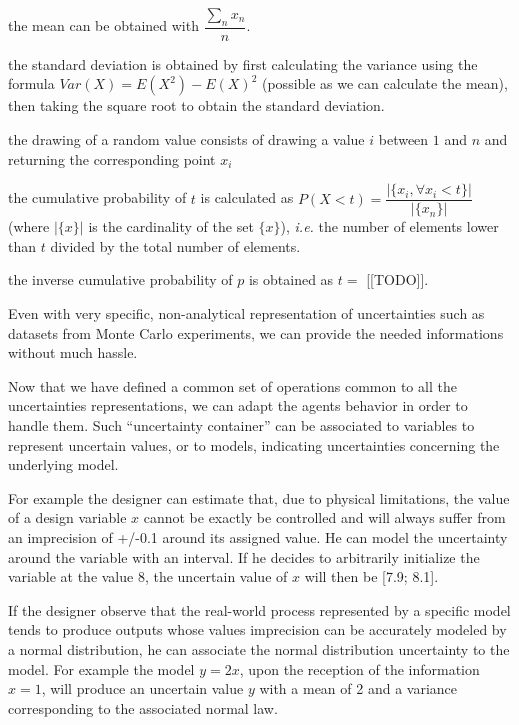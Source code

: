 \begin{compactitem}
\item the mean can be obtained with $\dfrac{\displaystyle\sum_n{x_n}}{n}$.
\item the standard deviation is obtained by first calculating the variance using the formula $Var(X) = E(X^2) - E(X)^2$ (possible as we can calculate the mean), then taking the square root to obtain the standard deviation.
\item the drawing of a random value consists of drawing a value $i$ between $1$ and $n$ and returning the corresponding point $x_i$
\item the cumulative probability of $t$ is calculated as  $P(X < t) = \dfrac{|\{x_i, \forall x_i < t\}|}{|\{x_n\}|}$ (where $|\{x\}|$ is the cardinality of the set $\{x\}$), \emph{i.e.} the number of elements lower than $t$ divided by the total number of elements.
\item the inverse cumulative probability of $p$ is obtained as $ t = $ [[TODO]].
\end{compactitem}

Even with very specific, non-analytical representation of uncertainties such as datasets from Monte Carlo experiments, we can provide the needed informations without much hassle.

Now that we have defined a common set of operations common to all the uncertainties representations, we can adapt the agents behavior in order to handle them. Such \enquote{uncertainty container} can be associated to variables to represent uncertain values, or to models, indicating uncertainties concerning the underlying model.

For example the designer can estimate that, due to physical limitations, the value of a design variable $x$ cannot be exactly be controlled and will always suffer from an imprecision of +/-0.1 around its assigned value. He can model the uncertainty around the variable with an interval. If he decides to arbitrarily initialize the variable at the value 8, the uncertain value of $x$ will then be [7.9; 8.1].

If the designer observe that the real-world process represented by a specific model tends to produce outputs whose values imprecision can be accurately modeled by a normal distribution, he can associate the normal distribution uncertainty to the model. For example the model $y = 2x$, upon the reception of the information $x = 1$, will produce an uncertain value $y$ with a mean of 2 and a variance corresponding to the associated normal law.

